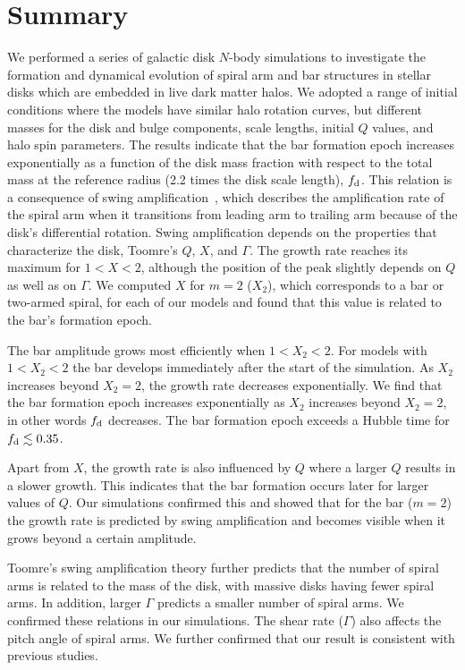 

\section{Summary}

We performed a series of galactic disk $N$-body simulations
to investigate the formation and dynamical evolution of spiral arm 
and bar structures in stellar disks which are embedded in live 
dark matter halos.
We adopted a range of initial conditions where the models have similar halo 
rotation curves, but different masses for the disk and bulge components, 
scale lengths, initial $Q$ values, and halo spin parameters.
The results indicate that the bar formation epoch increases exponentially 
as a function of the disk mass fraction with respect to the total mass at the 
reference radius (2.2 times the disk scale length), $f_{\rm d}$.
This relation is a consequence of swing amplification~\citep{1981seng.proc..111T},
which describes the amplification rate of the spiral arm when it transitions from 
leading arm to trailing arm because of the disk's differential rotation.
Swing amplification depends on the properties that characterize the disk, 
Toomre's $Q$, $X$, and $\Gamma$. The growth rate reaches its maximum
for $1<X<2$,  although the position of the peak slightly depends on $Q$ as well as on
$\Gamma$. We computed $X$ for 
$m=2$ ($X_2$), which corresponds to a bar or two-armed spiral, 
for each of our models and found that this value is related to the bar's
formation epoch.

The bar amplitude grows most efficiently when $1<X_2<2$. For models 
with $1<X_2<2$ the bar develops immediately after the start 
of the simulation. As $X_2$ increases beyond $X_2=2$, the growth rate
decreases exponentially. We find that the bar formation epoch increases
exponentially as $X_2$ increases beyond $X_2=2$, in other words
$f_{\rm d}$ decreases. The bar formation epoch exceeds a Hubble time
for $f_{\rm d}\lesssim 0.35$.

Apart from $X$, the growth rate is also influenced by $Q$ where
a larger $Q$ results in a slower growth. This indicates that the bar formation
occurs later for larger values of $Q$. 
Our simulations confirmed this and showed that for the bar ($m=2$) the growth rate
is predicted by swing amplification and becomes visible when it grows beyond a certain amplitude.

Toomre's swing amplification theory further predicts that
the number of spiral arms is related to the mass of the disk, with
massive disks having fewer spiral arms. In addition, larger $\Gamma$
predicts a smaller number of spiral arms.
We confirmed these relations in our simulations. 
The shear rate ($\Gamma$) also affects the pitch angle of spiral
  arms. We further confirmed that our result is consistent with previous
studies.

